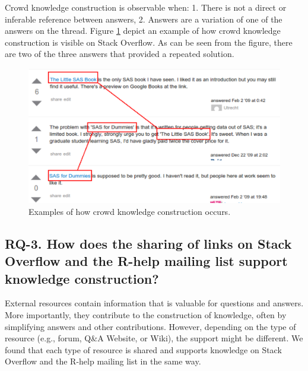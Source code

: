 \documentclass{sig-alternate-05-2015}
\begin{document}
	Crowd knowledge construction is observable when: 1. There is not a direct or inferable reference between answers, 2. Answers are a variation of one of the answers on the thread.
	Figure \ref{fig:CKC_MLSO} depict an example of how crowd knowledge construction is visible on Stack Overflow.
	As can be seen from the figure, there are two of the three answers that provided a repeated solution.


	\begin{figure} [!htb]
		\centering
		\includegraphics[width=0.8\columnwidth]{Figures/SO-CSimg2}
		\caption{Examples of how crowd knowledge construction occurs.}
		\label{fig:CKC_MLSO}
	\end{figure}

\subsection{RQ-3. How does the sharing of links on Stack Overflow and the R-help mailing list support knowledge construction? }


	External resources contain information that is valuable for questions and answers.
	More importantly, they contribute to the construction of knowledge, often by simplifying answers and other contributions.
	However, depending on the type of resource (e.g., forum, Q\&A Website, or Wiki), the support might be different.
	We found that each type of resource is shared and supports knowledge on Stack Overflow and the R-help mailing list in the same way.
\end{document}
